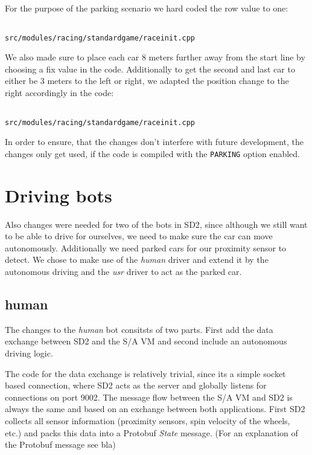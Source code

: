 \documentclass[paper=a4, fontsize=11pt]{scrreprt}
\begin{document}
For the purpose of the parking scenario we hard coded the row value to one:
\begin{listing}[ht]
  \inputminted[firstline=309,linenos=true,lastline=311,gobble=1]{c++}{../../../simulators/speed-dreams/src/modules/racing/standardgame/raceinit.cpp}
  \caption{\texttt{src/modules/racing/standardgame/raceinit.cpp}}
\end{listing}

We also made sure to place each car 8 meters further away from the start line by choosing a fix value in the code.
Additionally to get the second and last car to either be 3 meters to the left or right,
we adapted the position change to the right accordingly in the code:
\begin{listing}[ht]
  \inputminted[firstline=316,linenos=true,lastline=327,gobble=4]{c++}{../../../simulators/speed-dreams/src/modules/racing/standardgame/raceinit.cpp}
  \caption{\texttt{src/modules/racing/standardgame/raceinit.cpp}}
\end{listing}

In order to ensure, that the changes don't interfere with future development,
the changes only get used, if the code is compiled with the \texttt{PARKING} option enabled.

\section{Driving bots}
Also changes were needed for two of the bots in SD2,
since although we still want to be able to drive for ourselves,
we need to make sure the car can move autonomously.
Additionally we need parked cars for our proximity sensor to detect.
We chose to make use of the \textit{human} driver and extend it by the autonomous driving
and the \textit{usr} driver to act as the parked car.

\subsection{human}
The changes to the \textit{human} bot consitsts of two parts.
First add the data exchange between SD2 and the S/A VM
and second include an autonomous driving logic.

The code for the data exchange is relatively trivial,
since its a simple socket based connection,
where SD2 acts as the server and globally listens for connections on port 9002.
The message flow between the S/A VM and SD2 is always the same
and based on an exchange between both applications.
First SD2 collects all sensor information (proximity sensors, spin velocity of the wheels, etc.)
and packs this data into a Protobuf \textit{State} message.
(For an explanation of the Protobuf message see bla) %
\end{document}

